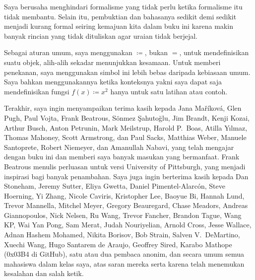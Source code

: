 Saya berusaha menghindari formalisme yang tidak perlu ketika formalisme itu
tidak membantu. Selain itu, pembuktian dan bahasanya sedikit demi sedikit
menjadi kurang formal seiring kemajuan kita dalam buku ini karena makin banyak
rincian yang tidak dituliskan agar uraian tidak berjejal.

Sebagai aturan umum, saya menggunakan $\coloneqq$, bukan $=$, untuk
mendefinisikan suatu objek, alih-alih sekadar menunjukkan kesamaan. Untuk
memberi penekanan, saya menggunakan simbol ini lebih bebas daripada kebiasaan
umum. Saya bahkan menggunakannya ketika konteksnya  yakni saya
dapat saja mendefinisikan fungsi $f(x) \coloneqq x^2$ hanya untuk satu latihan
atau contoh.

\medskip

Terakhir, saya ingin menyampaikan terima kasih kepada Jana Ma\v{r}\'ikov\'a,
Glen Pugh, Paul Vojta, Frank Beatrous, S\"{o}nmez \c{S}ahuto\u{g}lu,
Jim Brandt, Kenji Kozai, Arthur Busch,  Anton Petrunin,
Mark Meilstrup, Harold P.\ Boas, Atilla Y{\i}lmaz,
Thomas Mahoney, Scott Armstrong, dan Paul Sacks,
Matthias Weber, Manuele Santoprete,
Robert Niemeyer,
dan Amanullah Nabavi,
yang telah mengajar dengan buku ini dan memberi saya banyak masukan yang
bermanfaat.
Frank Beatrous menulis perluasan untuk versi University of Pittsburgh, yang
menjadi inspirasi bagi banyak penambahan.
Saya juga ingin berterima kasih kepada
Dan Stoneham, Jeremy Sutter, Eliya Gwetta, Daniel Pimentel-Alarc\'on,
Steve Hoerning, Yi Zhang, Nicole Caviris,
Kristopher Lee, Baoyue Bi, Hannah Lund,
Trevor Mannella, Mitchel Meyer, Gregory Beauregard,
Chase Meadors, Andreas Giannopoulos, Nick Nelsen,
Ru Wang, Trevor Fancher, Brandon Tague, Wang KP\@,
Wai Yan Pong, Sam Merat, Judah Nouriyelian,
Arnold Cross, Jesse Wallace,
Adnan Hashem Mohamed,
Nikita Borisov, Bob Strain,
Salven V.\ DeMartino,
Xuechi Wang,
Hugo Santarem de Araujo,
Geoffrey Sired,
Karabo Mathope (0x03B4 di GitHub),
satu atau dua pembaca anonim, dan secara umum semua mahasiswa dalam kelas saya,
atas saran mereka serta karena telah menemukan kesalahan dan salah ketik.

\VolTwoIntro

